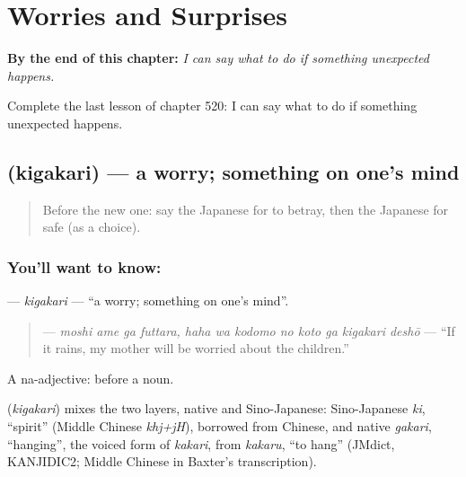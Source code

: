 
\chapter{Worries and Surprises}
\label{ch:ja-worries-and-surprises}

\begin{chapteropening}
\textbf{By the end of this chapter:} \emph{I can say what to do if something unexpected happens.}

Complete the last lesson of chapter 520: I can say what to do if something unexpected happens.
\end{chapteropening}

\section[\texorpdfstring{\ja{きがかり} (kigakari)}{きがかり (kigakari)}]{ (kigakari) — a worry; something on one's mind}

\label{lesson:JA-C520-kigakari}



\begin{quote}
Before the new one: say the Japanese for to betray, then the Japanese for safe (as a choice).
\end{quote}

\subsection*{You'll want to know: }
\textbf{} — \emph{kigakari} — \textquotedblleft{}a worry; something on one's mind\textquotedblright{}.

\begin{quote}
\textbf{     } — \emph{moshi ame ga futtara, haha wa kodomo no koto ga kigakari deshō} — \textquotedblleft{}If it rains, my mother will be worried about the children.\textquotedblright{}
\end{quote}

A na-adjective:  before a noun.

\begin{cousinweb}
\textbf{} (\emph{kigakari}) mixes the two layers, native and Sino-Japanese: Sino-Japanese \emph{ki}, \textquotedblleft{}spirit\textquotedblright{} (Middle Chinese \emph{khj+jH}), borrowed from Chinese, and native \emph{gakari}, \textquotedblleft{}hanging\textquotedblright{}, the voiced form of \emph{kakari}, from \emph{kakaru}, \textquotedblleft{}to hang\textquotedblright{} (JMdict, KANJIDIC2; Middle Chinese in Baxter's transcription).
\end{cousinweb}

